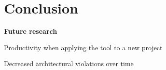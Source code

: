 \chapter{Conclusion}


\textbf{Future research}

Productivity when applying the tool to a new project

Decreased architectural violations over time


